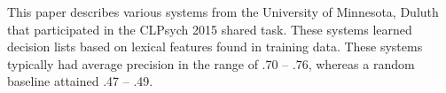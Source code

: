 This paper describes various systems from the University of Minnesota, Duluth that participated in the CLPsych 2015 shared task. These systems learned decision lists based on lexical features found in training data. These systems typically had average precision in the range of .70 -- .76, whereas a random baseline attained .47 -- .49.
